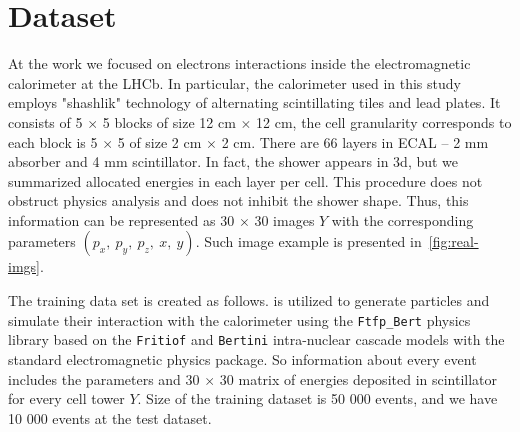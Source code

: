 \section{Dataset}
At the work we focused on electrons interactions inside the electromagnetic calorimeter at the LHCb. In particular, the calorimeter used in this study employs "shashlik" technology of alternating scintillating tiles and lead plates. It consists of 5 $\times$ 5 blocks of size 12 cm $\times$ 12 cm, the cell granularity corresponds to each block is 5 $\times$ 5 of size 2 cm $\times$ 2 cm. There are 66 layers in ECAL -- 2 mm absorber and 4 mm scintillator. In fact, the shower appears in 3d, but we summarized allocated energies in each layer per cell. This procedure does not obstruct physics analysis and does not inhibit the shower shape. Thus, this information can be represented as 30 $\times$ 30 images $Y$ with the corresponding parameters $(p_x,~ p_y,~ p_z,~ x,~ y)$. Such image example is presented in~\cref{fig:real-imgs}.

The training data set is created as follows. \geant is utilized to generate particles and simulate their interaction with the calorimeter using the \texttt{Ftfp\_Bert} physics library based on the \texttt{Fritiof}  and \texttt{Bertini} intra-nuclear cascade models with the standard electromagnetic physics package. So information about every event includes the parameters and 30 $\times$ 30 matrix of energies deposited in scintillator for every cell tower $Y$. Size of the training dataset is 50 000 events, and we have 10 000 events at the test dataset.

